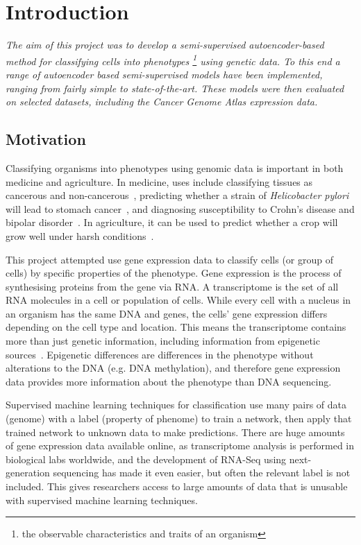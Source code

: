 \chapter{Introduction}

\textit{The aim of this project was to develop a semi-supervised autoencoder-based method for classifying 
cells into phenotypes \footnote{the observable characteristics and traits of an organism} using genetic data. To this end a range 
of autoencoder based semi-supervised models have been implemented, 
ranging from fairly simple to state-of-the-art. These models were then evaluated on selected datasets, including 
the Cancer Genome Atlas expression data.}

\section{Motivation}

Classifying organisms into phenotypes using genomic data is important in both medicine and agriculture. In medicine, uses include 
classifying tissues as cancerous and non-cancerous~\cite{Li2017}, predicting whether a strain of \textit{Helicobacter pylori} will lead to 
stomach cancer~\cite{helicobacter}, and diagnosing susceptibility to Crohn's disease and bipolar disorder~\cite{doi:10.1002/humu.23280}.
In agriculture, it can be used to predict whether a crop will grow well under harsh conditions~\cite{cimmyt}.

This project attempted use gene expression data to classify cells (or group of cells) by specific properties of the phenotype. Gene expression is the process of synthesising 
proteins from the gene via RNA. A transcriptome is the set of all RNA 
molecules in a cell or population of cells. While every cell with a nucleus in an organism has the same DNA and genes, the cells'
gene expression differs depending on the cell type and location. This means the
transcriptome contains more than just genetic information, including information from epigenetic sources~\cite{Gibney2010}. Epigenetic differences are differences
in the phenotype without alterations to the DNA (e.g. DNA methylation), and therefore gene expression data provides more information about 
the phenotype than DNA sequencing.

Supervised machine learning techniques for classification use many pairs of data (genome) with a label
(property of phenome) to train a network, then apply that trained network to unknown data to make predictions. 
There are huge amounts of gene expression data available online, as transcriptome analysis is performed in biological labs worldwide, 
and the development of RNA-Seq using next-generation sequencing has made it even easier, but often the relevant 
label is not included. This gives researchers access to large 
amounts of data that is unusable with supervised machine learning techniques.

